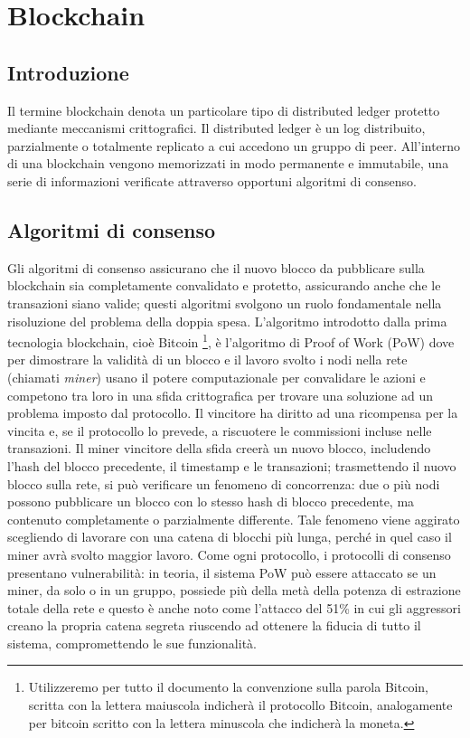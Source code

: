 \chapter{Blockchain}
\label{chap:blockchain}

\section{Introduzione}
\label{sec:introduzione}

Il termine blockchain denota un particolare tipo di distributed ledger protetto mediante meccanismi crittografici.
Il distributed ledger è un log distribuito, parzialmente o totalmente replicato a cui accedono un gruppo di peer.
All’interno di una blockchain vengono memorizzati in modo permanente e immutabile, una serie di informazioni verificate attraverso opportuni algoritmi di consenso.


\section{Algoritmi di consenso}
\label{sec:algoritmi di consenso}

Gli algoritmi di consenso assicurano che il nuovo blocco da pubblicare sulla blockchain sia completamente convalidato e protetto, assicurando anche che le transazioni siano valide; questi algoritmi svolgono un ruolo fondamentale nella risoluzione del problema della doppia spesa.
L’algoritmo introdotto dalla prima tecnologia blockchain, cioè Bitcoin \footnote{Utilizzeremo per tutto il documento la convenzione sulla parola Bitcoin, scritta con la lettera maiuscola indicherà il protocollo Bitcoin, analogamente per bitcoin scritto con la lettera minuscola che indicherà la moneta.}, è l’algoritmo di  Proof of Work (PoW) dove per dimostrare la validità di un blocco e il lavoro svolto i nodi nella rete (chiamati {\it miner\/}) usano il potere computazionale per convalidare le azioni e competono tra loro in una sfida crittografica per trovare una soluzione ad un problema imposto dal protocollo.
Il vincitore ha diritto ad una ricompensa per la vincita e, se il protocollo lo prevede, a riscuotere le commissioni incluse nelle transazioni.
Il miner vincitore della sfida creerà un nuovo blocco, includendo l’hash del blocco precedente, il timestamp e le transazioni; trasmettendo il nuovo blocco sulla rete, si può verificare un fenomeno di concorrenza: due o più nodi possono pubblicare un blocco con lo stesso hash di blocco precedente, ma contenuto completamente o parzialmente differente. Tale fenomeno viene aggirato scegliendo di lavorare con una catena di blocchi più lunga, perché in quel caso il miner avrà svolto maggior lavoro.
Come ogni protocollo, i protocolli di consenso presentano vulnerabilità: in teoria, il sistema PoW può essere attaccato se un miner, da solo o in un gruppo, possiede più della metà della potenza di estrazione totale della rete e questo è anche noto come l'attacco del 51\% in cui gli aggressori creano la propria catena segreta riuscendo ad ottenere la fiducia di tutto il sistema, compromettendo le sue funzionalità.


